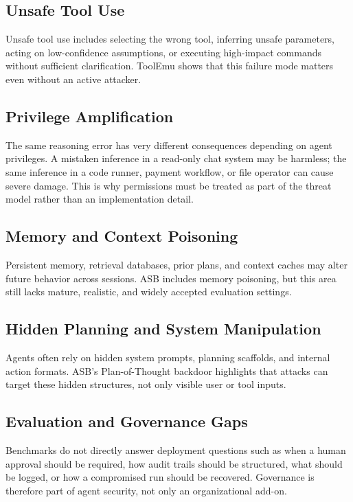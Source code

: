 \documentclass[conference]{IEEEtran}
\begin{document}
\subsection{Unsafe Tool Use}

Unsafe tool use includes selecting the wrong tool, inferring unsafe parameters, acting on low-confidence assumptions, or executing high-impact commands without sufficient clarification. ToolEmu shows that this failure mode matters even without an active attacker.

\subsection{Privilege Amplification}

The same reasoning error has very different consequences depending on agent privileges. A mistaken inference in a read-only chat system may be harmless; the same inference in a code runner, payment workflow, or file operator can cause severe damage. This is why permissions must be treated as part of the threat model rather than an implementation detail.

\subsection{Memory and Context Poisoning}

Persistent memory, retrieval databases, prior plans, and context caches may alter future behavior across sessions. ASB includes memory poisoning, but this area still lacks mature, realistic, and widely accepted evaluation settings.

\subsection{Hidden Planning and System Manipulation}

Agents often rely on hidden system prompts, planning scaffolds, and internal action formats. ASB's Plan-of-Thought backdoor highlights that attacks can target these hidden structures, not only visible user or tool inputs.

\subsection{Evaluation and Governance Gaps}

Benchmarks do not directly answer deployment questions such as when a human approval should be required, how audit trails should be structured, what should be logged, or how a compromised run should be recovered. Governance is therefore part of agent security, not only an organizational add-on.
\end{document}
